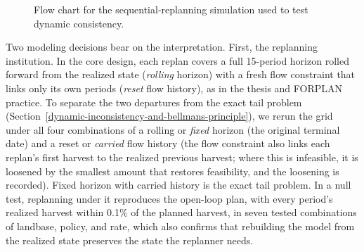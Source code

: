 \begin{figure}[htbp]
\centering
{}
\caption{Flow chart for the sequential-replanning simulation used to test dynamic consistency.}
\label{fig:sequential-replanning}
\end{figure}

Two modeling decisions bear on the interpretation. First, the replanning institution. In the core design, each replan covers a full 15-period horizon rolled forward from the realized state (\emph{rolling} horizon) with a fresh flow constraint that links only its own periods (\emph{reset} flow history), as in the thesis \citep[pp.~82, 119--120]{daugherty1991credibility} and FORPLAN practice. To separate the two departures from the exact tail problem (Section~\ref{dynamic-inconsistency-and-bellmans-principle}), we rerun the grid under all four combinations of a rolling or \emph{fixed} horizon (the original terminal date) and a reset or \emph{carried} flow history (the flow constraint also links each replan's first harvest to the realized previous harvest; where this is infeasible, it is loosened by the smallest amount that restores feasibility, and the loosening is recorded). Fixed horizon with carried history is the exact tail problem. In a null test, replanning under it reproduces the open-loop plan, with every period's realized harvest within 0.1\% of the planned harvest, in seven tested combinations of landbase, policy, and rate, which also confirms that rebuilding the model from the realized state preserves the state the replanner needs.

